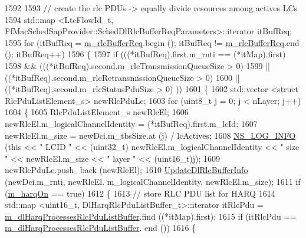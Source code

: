 \begin{DoxyCode}
1592 
1593       \textcolor{comment}{// create the rlc PDUs -> equally divide resources among actives LCs}
1594       std::map <LteFlowId\_t, FfMacSchedSapProvider::SchedDlRlcBufferReqParameters>::iterator itBufReq;
1595       \textcolor{keywordflow}{for} (itBufReq = \hyperlink{classns3_1_1PssFfMacScheduler_af66c823e9ee8ce17084dff35ce128191}{m\_rlcBufferReq}.begin (); itBufReq != 
      \hyperlink{classns3_1_1PssFfMacScheduler_af66c823e9ee8ce17084dff35ce128191}{m\_rlcBufferReq}.end (); itBufReq++)
1596         \{
1597           \textcolor{keywordflow}{if} (((*itBufReq).first.m\_rnti == (*itMap).first)
1598               && (((*itBufReq).second.m\_rlcTransmissionQueueSize > 0)
1599                   || ((*itBufReq).second.m\_rlcRetransmissionQueueSize > 0)
1600                   || ((*itBufReq).second.m\_rlcStatusPduSize > 0) ))
1601             \{
1602               std::vector <struct RlcPduListElement\_s> newRlcPduLe;
1603               \textcolor{keywordflow}{for} (uint8\_t j = 0; j < nLayer; j++)
1604                 \{
1605                   RlcPduListElement\_s newRlcEl;
1606                   newRlcEl.m\_logicalChannelIdentity = (*itBufReq).first.m\_lcId;
1607                   newRlcEl.m\_size = newDci.m\_tbsSize.at (j) / lcActives;
1608                   \hyperlink{group__logging_gafbd73ee2cf9f26b319f49086d8e860fb}{NS\_LOG\_INFO} (\textcolor{keyword}{this} << \textcolor{stringliteral}{" LCID "} << (uint32\_t) newRlcEl.m\_logicalChannelIdentity 
      << \textcolor{stringliteral}{" size "} << newRlcEl.m\_size << \textcolor{stringliteral}{" layer "} << (uint16\_t)j);
1609                   newRlcPduLe.push\_back (newRlcEl);
1610                   \hyperlink{classns3_1_1PssFfMacScheduler_a892f1cbf2d0ef364fd0dbca6dc6a7848}{UpdateDlRlcBufferInfo} (newDci.m\_rnti, newRlcEl.
      m\_logicalChannelIdentity, newRlcEl.m\_size);
1611                   \textcolor{keywordflow}{if} (\hyperlink{classns3_1_1PssFfMacScheduler_a7163e6149892abe4c17ce95be6bf1953}{m\_harqOn} == \textcolor{keyword}{true})
1612                     \{
1613                       \textcolor{comment}{// store RLC PDU list for HARQ}
1614                       std::map <uint16\_t, DlHarqRlcPduListBuffer\_t>::iterator itRlcPdu =  
      \hyperlink{classns3_1_1PssFfMacScheduler_a0f31f16c2a9f067c6189462a9797e06b}{m\_dlHarqProcessesRlcPduListBuffer}.find ((*itMap).first);
1615                       \textcolor{keywordflow}{if} (itRlcPdu == \hyperlink{classns3_1_1PssFfMacScheduler_a0f31f16c2a9f067c6189462a9797e06b}{m\_dlHarqProcessesRlcPduListBuffer}.
      end ())
1616                         \{

\end{DoxyCode}
